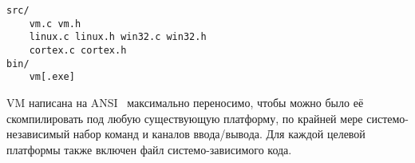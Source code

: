\clearpage
{}\label{vm}\secdown

\begin{verbatim}
src/
    vm.c vm.h
    linux.c linux.h win32.c win32.h
    cortex.c cortex.h
bin/
    vm[.exe]
\end{verbatim}

\noindent
VM написана на ANSI \ci\ максимально переносимо, чтобы можно было её
скомпилировать под любую существующую платформу, по крайней мере
системо-независимый набор команд и каналов ввода/вывода. Для каждой целевой
платформы также включен файл системо-зависимого кода.

\secup
